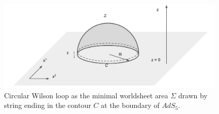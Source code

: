 \begin{figure}[t]
\begin{center}
\includegraphics[width=11cm]{Images/WLcircle.pdf}
\end{center}
\caption{\label{fig:WLcircle} Circular Wilson loop as the minimal worldsheet area $\Sigma$ drawn by string ending in the contour $C$ at the boundary of $AdS_5$. }
\end{figure}


